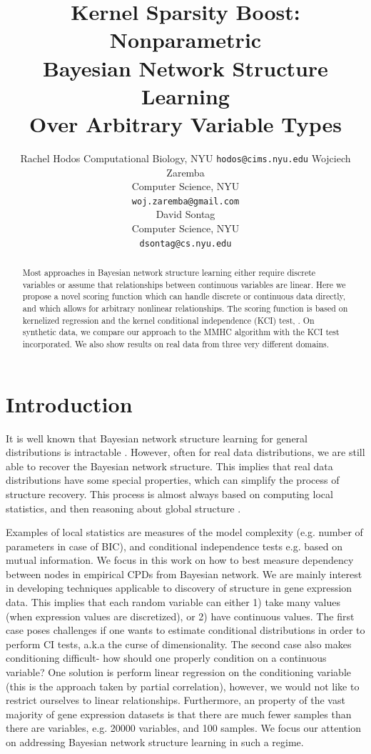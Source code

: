 \documentclass{article} %
\title{Kernel Sparsity Boost: Nonparametric \\ Bayesian Network Structure Learning \\ Over Arbitrary Variable Types}
\author{
Rachel Hodos
Computational Biology, NYU
\texttt{hodos@cims.nyu.edu}
\Xnd
Wojciech Zaremba \\
Computer Science, NYU \\
\texttt{woj.zaremba@gmail.com} \\
\XND
David Sontag \\
Computer Science, NYU \\
\texttt{dsontag@cs.nyu.edu} \\
}
\begin{document}
\maketitle

\begin{abstract}

Most approaches in Bayesian network structure learning either require discrete variables or assume that relationships between continuous variables are linear.  Here we propose a novel scoring function which can handle discrete or continuous data directly, and which allows for arbitrary nonlinear relationships.  The scoring function is based on kernelized regression and the kernel conditional independence (KCI) test, \cite{zhang2012kernel}.  On synthetic data, we compare our approach to the MMHC algorithm with the KCI test incorporated.  We also show results on real data from three very different domains.

\end{abstract}


\section{Introduction}
It is well known that Bayesian network structure learning for general distributions is intractable \cite{chickering1996learning}. However, often for real data distributions, we are still able to recover the Bayesian network structure. This implies that real data distributions have some special properties, which can simplify the process of structure recovery.  This  process is almost always based on computing local statistics, and then reasoning about global structure \cite{jaakkola2010learning, tsamardinos2006max}. 

Examples of local statistics are measures of the model complexity (e.g. number of parameters in case of BIC\cite{schwarz1978estimating}), and conditional independence tests e.g. based on mutual information.  We focus in this work on how to best measure dependency between nodes in empirical CPDs from Bayesian network. We are mainly interest in developing techniques applicable to discovery of structure in gene expression data. This implies that each random variable can either 1) take many values (when expression values are discretized), or 2) have continuous values. The first case poses challenges if one wants to estimate conditional distributions in order to perform CI tests, a.k.a the curse of dimensionality.  The second case also makes conditioning difficult- how should one properly condition on a continuous variable?  One solution is perform linear regression on the conditioning variable (this is the approach taken by partial correlation), however, we would not like to restrict ourselves to linear relationships.  Furthermore, an property of the vast majority of gene expression datasets is that there are much fewer samples than there are variables, e.g. 20000 variables, and 100 samples.   We focus our attention on addressing Bayesian network structure learning
in such a regime. 
\end{document}
